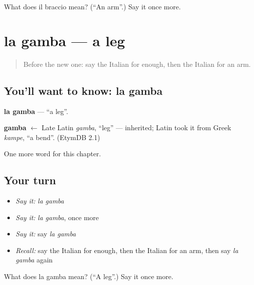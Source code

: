 \begin{tcolorbox}[breakable,colback=teal!4,colframe=teal!35!black,title={Before you move on}]
What does il braccio mean? (\textquotedblleft{}An arm\textquotedblright{}.) Say it once more.
\end{tcolorbox}
\section[la gamba]{la gamba — a leg}

\label{lesson:IT-C37-gamba}



\begin{quote}
Before the new one: say the Italian for enough, then the Italian for an arm.
\end{quote}

\subsection*{You'll want to know: la gamba}
\textbf{la gamba} — \textquotedblleft{}a leg\textquotedblright{}.

\begin{cousinweb}
\textbf{gamba} $\leftarrow$ Late Latin \emph{gamba}, \textquotedblleft{}leg\textquotedblright{} — inherited; Latin took it from Greek \emph{kampe}, \textquotedblleft{}a bend\textquotedblright{}. (EtymDB 2.1)
\end{cousinweb}

\begin{grammarlens}[title={What you've built}]
One more word for this chapter.
\end{grammarlens}

\subsection*{Your turn}
\begin{itemize}
\raggedright
  \item \emph{Say it:} \emph{la gamba}
  \item \emph{Say it:} \emph{la gamba}, once more
  \item \emph{Say it:} say \emph{la gamba}
  \item \emph{Recall:} say the Italian for enough, then the Italian for an arm, then say \emph{la gamba} again
\end{itemize}

\begin{tcolorbox}[breakable,colback=teal!4,colframe=teal!35!black,title={Before you move on}]
What does la gamba mean? (\textquotedblleft{}A leg\textquotedblright{}.) Say it once more.
\end{tcolorbox}
